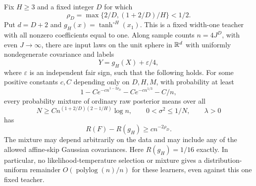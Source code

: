 \begin{theorem}
\label{thm:simple-teacher-rate}
Fix $H\ge3$ and a fixed integer $D$ for which
\[
 \rho_D=\max\{2/D,(1+2/D)/H\}<1/2.
\]
Put $d=D+2$ and $g_H(x)=\tanh^{\circ H}(x_1)$. This is a fixed width-one teacher with all nonzero coefficients equal to one. Along sample counts $n=4J^D$, with even $J\to\infty$, there are input laws on the unit sphere in $\mathbb R^d$ with uniformly nondegenerate covariance and labels
\[
 Y=g_H(X)+\varepsilon/4,
\]
where $\varepsilon$ is an independent fair sign, such that the following holds. For some positive constants $c,C$ depending only on $D,H,M$, with probability at least
\[
 1-Ce^{-c n^{1-2\rho_D}}-Ce^{-c n^{1/3}}-C/n,
\]
every probability mixture of ordinary raw posterior means over all
\[
 N\ge C n^{(1+2/D)(2-1/H)}\log n,\qquad
 0<\sigma^2\le1/N,\qquad \lambda>0
\]
has
\[
 R(F)-R(g_H)\ge c n^{-2\rho_D}.
\]
The mixture may depend arbitrarily on the data and may include any of the allowed affine-skip Gaussian covariances. Here $R(g_H)=1/16$ exactly. In particular, no likelihood-temperature selection or mixture gives a distribution-uniform remainder $O(\operatorname{polylog}(n)/n)$ for these learners, even against this one fixed teacher.
\end{theorem}
